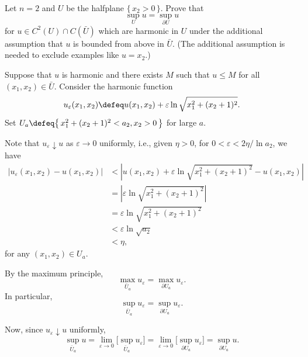 \begin{problem}
  Let \(n=2\) and \(U\) be the halfplane \(\{\,x_2>0\,\}\). Prove that
  \[
    \sup_U u=\sup_{\partial U}u
  \]
  for \(u\in C^2(U)\cap C(\bar U)\) which are harmonic in \(U\) under the
  additional assumption that \(u\) is bounded from above in \(\bar
  U\). (The additional assumption is needed to exclude examples like
  \(u=x_2\).)

\end{problem}
\begin{solution}
  Suppose that \(u\) is harmonic and there exists \(M\) such that
  \(u\leq M\) for all \((x_1,x_2)\in\bar U\). Consider the harmonic
  function
  \[
    u_\varepsilon(x_1,x_2)\defeq
    u(x_1,x_2)+\varepsilon\ln\sqrt{x_1^2+(x_2+1)^2}.
  \]
  Set \(U_a\defeq \bigl\{\,x_1^2+(x_2+1)^2<a_2,x_2>0\,\bigr\}\) for large
  \(a\).

  Note that \(u_\varepsilon\downarrow u\) as \(\varepsilon\to 0\) uniformly, i.e.,
  given \(\eta>0\), for \(0<\varepsilon<2\eta/{\ln a_2}\), we have
  \begin{align*}
    |u_\varepsilon(x_1,x_2)-u(x_1,x_2)|
    &<\left|
      u(x_1,x_2)+\varepsilon\ln\sqrt{x_1^2+(x_2+1)^2}
      -u(x_1,x_2)
      \right|\\
    &=\left|
      \varepsilon\ln\sqrt{x_1^2+(x_2+1)^2}
      \right|\\
    &=\varepsilon\ln\sqrt{x_1^2+(x_2+1)^2}\\
    &<\varepsilon\ln\sqrt{a_2}\\
    &<\eta,
  \end{align*}
  for any \((x_1,x_2)\in U_a\).

  By the maximum principle,
  \[
    \max_{\bar U_a}u_\varepsilon=\max_{\partial U_a}u_\varepsilon.
  \]
  In particular,
  \begin{equation}
    \label{eq:5:sup-epsilon}
    \sup_{\bar U_a}u_\varepsilon=\sup_{\partial U_a}u_\varepsilon.
  \end{equation}

  Now, since \(u_\varepsilon\downarrow u\) uniformly,
  \[
    \sup_{\bar U_a}u=%
    \lim_{\varepsilon\to 0}\biggl[\sup_{\bar U_a}u_\varepsilon\biggr]=%
    \lim_{\varepsilon\to 0}\biggl[\sup_{\partial U_a}u_\varepsilon\biggr]=%
    \sup_{\partial U_a}u.
  \]
\end{solution}
\newpage


